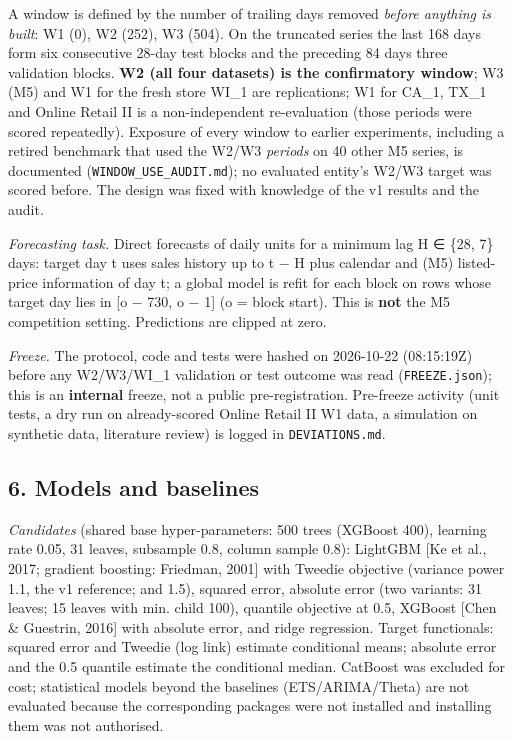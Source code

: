 \documentclass[
]{article}
\begin{document}
A window is defined by the number of trailing days removed \emph{before
anything is built}: W1 (0), W2 (252), W3 (504). On the truncated series
the last 168 days form six consecutive 28-day test blocks and the
preceding 84 days three validation blocks. \textbf{W2 (all four
datasets) is the confirmatory window}; W3 (M5) and W1 for the fresh
store WI\_1 are replications; W1 for CA\_1, TX\_1 and Online Retail II
is a non-independent re-evaluation (those periods were scored
repeatedly). Exposure of every window to earlier experiments, including
a retired benchmark that used the W2/W3 \emph{periods} on 40 other M5
series, is documented (\texttt{WINDOW\_USE\_AUDIT.md}); no evaluated
entity's W2/W3 target was scored before. The design was fixed with
knowledge of the v1 results and the audit.

\emph{Forecasting task.} Direct forecasts of daily units for a minimum
lag H ∈ \{28, 7\} days: target day t uses sales history up to t − H plus
calendar and (M5) listed-price information of day t; a global model is
refit for each block on rows whose target day lies in {[}o − 730, o −
1{]} (o = block start). This is \textbf{not} the M5 competition setting.
Predictions are clipped at zero.

\emph{Freeze.} The protocol, code and tests were hashed on 2026-10-22
(08:15:19Z) before any W2/W3/WI\_1 validation or test outcome was read
(\texttt{FREEZE.json}); this is an \textbf{internal} freeze, not a
public pre-registration. Pre-freeze activity (unit tests, a dry run on
already-scored Online Retail II W1 data, a simulation on synthetic data,
literature review) is logged in \texttt{DEVIATIONS.md}.

\subsection{6. Models and baselines}\label{models-and-baselines}

\emph{Candidates} (shared base hyper-parameters: 500 trees (XGBoost
400), learning rate 0.05, 31 leaves, subsample 0.8, column sample 0.8):
LightGBM {[}Ke et al., 2017; gradient boosting: Friedman, 2001{]} with
Tweedie objective (variance power 1.1, the v1 reference; and 1.5),
squared error, absolute error (two variants: 31 leaves; 15 leaves with
min. child 100), quantile objective at 0.5, XGBoost {[}Chen \& Guestrin,
2016{]} with absolute error, and ridge regression. Target functionals:
squared error and Tweedie (log link) estimate conditional means;
absolute error and the 0.5 quantile estimate the conditional median.
CatBoost was excluded for cost; statistical models beyond the baselines
(ETS/ARIMA/Theta) are not evaluated because the corresponding packages
were not installed and installing them was not authorised.
\end{document}
